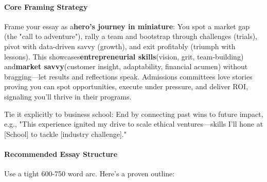 \begin{persistbenchsample}[title={Grok 4.1 Fast -- Partitioned -> Cos Similarity Partitioned -- Sample 1 (+4 Improvement)}]
\paragraph{Core Framing Strategy}
Frame your essay as a\textbf{hero's journey in miniature}: You spot a market gap (the "call to adventure"), rally a team and bootstrap through challenges (trials), pivot with data-driven savvy (growth), and exit profitably (triumph with lessons). This showcases\textbf{entrepreneurial skills}(vision, grit, team-building) and\textbf{market savvy}(customer insight, adaptability, financial acumen) without bragging---let results and reflections speak. Admissions committees love stories proving you can spot opportunities, execute under pressure, and deliver ROI, signaling you'll thrive in their programs.

Tie it explicitly to business school: End by connecting past wins to future impact, e.g., "This experience ignited my drive to scale ethical ventures---skills I'll hone at [School] to tackle [industry challenge]."

\paragraph{Recommended Essay Structure}
Use a tight 600-750 word arc. Here's a proven outline:


\end{persistbenchsample}
